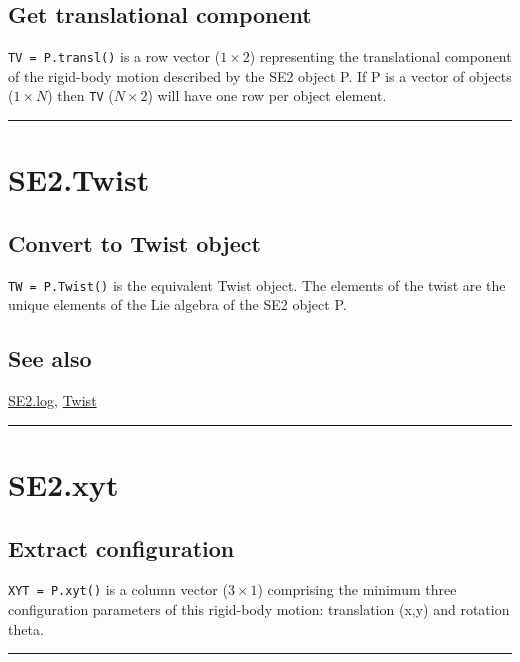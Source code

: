 \subsection*{Get translational component}


\texttt{TV = P.transl()} is a row vector ($1 \times 2$) representing the translational component of
the rigid-body motion described by the SE2 object P.  If P is a vector of
objects ($1 \times N$) then \texttt{TV} ($N \times 2$) will have one row per object element.

\vspace{1.5ex}\hrule

\hypertarget{SE2.Twist}{\section*{SE2.Twist}}
\subsection*{Convert to Twist object}


\texttt{TW = P.Twist()} is the equivalent Twist object.  The elements of the twist are the unique
elements of the Lie algebra of the SE2 object P.


\subsection*{See also}


\hyperlink{SE2.log}{\color{blue} SE2.log}, \hyperlink{Twist}{\color{blue} Twist}

\vspace{1.5ex}\hrule

\hypertarget{SE2.xyt}{\section*{SE2.xyt}}
\subsection*{Extract configuration}


\texttt{XYT = P.xyt()} is a column vector ($3 \times 1$) comprising the minimum three
configuration parameters of this rigid-body motion: translation (x,y)
and rotation theta.

\vspace{1.5ex}\rule{\textwidth}{1mm}

